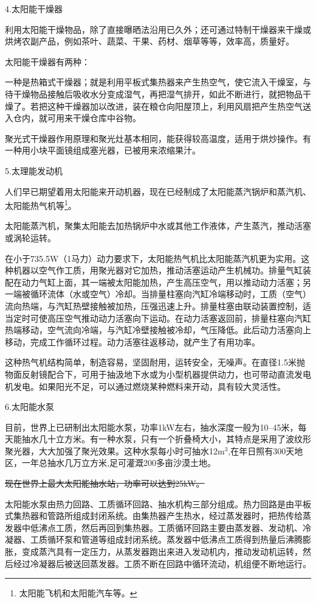 \documentclass{ctexbook}
\begin{document}
4.太阳能干燥器

利用太阳能干燥物品，除了直接曝晒法沿用已久外；还可通过特制干燥器来干燥或烘烤农副产品，例如茶叶、蔬菜、干果、药材、烟草等等，效率高，质量好。

太阳能干燥器有两种：

一种是热箱式干燥器；就是利用平板式集热器来产生热空气，使它流入干燥室，与待干燥物品接触后吸收水分变成湿气，再把湿气排开，如此不断进行，就把物品干燥了。若把这种干燥器加以改进，装在粮仓向阳屋顶上，利用风扇把产生热空气送入仓内，就可用来干燥仓库中谷物。

聚光式干燥器作用原理和聚光灶基本相同，能获得较高温度，适用于烘炒操作。有一种用小块平面镜组成塞光器，已被用来浓缩果汁。

5.太理能发动机

人们早已期望着用太阳能来开动机器，现在已经制成了太阳能蒸汽锅炉和蒸汽机、太阳能热气机等\footnote{太阳能飞机和太阳能汽车等。}。

太阳能蒸汽机，聚集太阳能去加热锅炉中水或其他工作液体，产生蒸汽，推动活塞或涡轮运转。

在小于735.5W（1马力）动力要求下，太阳能热气机比太阳能蒸汽机更为实用。这种机器以空气作工质，用聚光器对它加热，推动活塞运动产生机械功。排量气缸装配在动力气缸上面，其一端被太阳能加热，产生高压空气，用以推动动力活塞；另一端被循环流体（水或空气）冷却。当排量柱塞向汽缸冷端移动时，工质（空气）流向热端，与汽缸热壁接触被加热，压强迅速上升。排量柱塞由联动装置控制，适当定时可使高压空气推动动力活塞向下运动。在动力活塞返回前，排量柱塞向汽缸热端移动，空气流向冷端，与汽缸冷壁接触被冷却，气压降低。此后动力活塞向上移动，完成工作循环过程。动力活塞往返移动，就产生了有用功率。

这种热气机结构简单，制造容易，坚固耐用，运转安全，无噪声。在直径1.5米抛物面反射镜配合下，可用于抽汲地下水或为小型机器提供动力，也可带动直流发电机发电。如果阳光不足，可以通过燃烧某种燃料来开动，具有较大灵活性。	

6.太阳能水泵

目前，世界上已研制出太阳能水泵，功率1kW左右，抽水深度一般为10--45米，每天能抽水几十立方米。有一种水泵，只有一个折叠椅大小，其特点是采用了波纹形聚光器，大大加强了聚光效果。这种水泵每小时可抽水12m$^{3}$,在年日照有300天地区，一年总抽水几万立方米,足可灌溉200多亩沙漠土地。

\sout{现在世界上最大太阳能抽水站，功率可以达到25kW。}

太阳能水泵由热力回路、工质循环回路、抽水机构三部分组成。热力回路是由平板式集热器和管路所组成封闭系统。由集热器产生热水，经过蒸发器时，把热传给蒸发器中低沸点工质，然后再回到集热器。工质循环回路主要由蒸发器、发动机、冷凝器、工质循环泵和管道等组成封闭系统。蒸发器中低沸点工质得到热量后沸腾膨胀，变成蒸汽具有一定压力，从蒸发器跑出来进入发动机内，推动发动机运转，然后经过冷凝器后被送回蒸发器。工质不断在回路中循环流动，机组便不断地运行。
\end{document}
